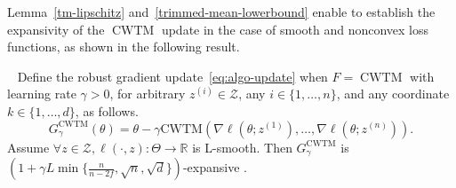 \documentclass[twoside,11pt]{article}
\newcommand\mc{\mathcal}
\newcommand\mb{\mathbb}
\begin{document}
Lemma~\ref{tm-lipschitz} and~\ref{trimmed-mean-lowerbound} enable to establish the expansivity of the $\operatorname{CWTM}$ update in the case of smooth and nonconvex loss functions, as shown in the following result. 
\begin{lemma}~\label{lemmarobustexpansivity}
    Define the robust gradient update~\eqref{eq:algo-update} when $F=\operatorname{CWTM}$ with learning rate $\gamma > 0$, for arbitrary $z^{(i)} \in \mc{Z}$, any $i \in \{1, \ldots, n\}$, and any coordinate $k \in \{1, \ldots, d\}$, as follows.
    \[
        G^{\mathrm{CWTM}}_{\gamma}(\theta) = \theta - \gamma \mathrm{CWTM}(\nabla \ell (\theta; z^{(1)}), \ldots, \nabla \ell (\theta; z^{(n)})).
    \] 
    Assume \( \forall z \in \mc{Z}, \ell(\cdot, z): \Theta \to \mb{R} \) is L-smooth. 
    Then $G^{\mathrm{CWTM}}_{\gamma}$ is $(1+ \gamma L\min\{\frac{n}{n-2f}, \sqrt{n}, \sqrt{d}\})$-expansive \citep[Definition 2.3]{hardt2016train}. 
\end{lemma}
\end{document}
